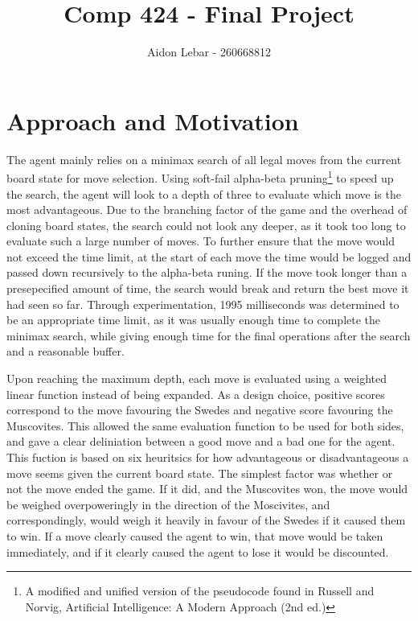 \documentclass[11 pt, letter paper]{article}
\title{Comp 424 - Final Project}
\author{Aidon Lebar - 260668812}
\begin{document}
    \maketitle
    \section{Approach and Motivation}
        The agent mainly relies on a minimax search of all legal moves from the current board state for move selection.
        Using soft-fail alpha-beta pruning\footnote{A modified and unified version of the pseudocode found in Russell and Norvig, Artificial Intelligence: A Modern Approach (2nd ed.)}
        to speed up the search, the agent will look to a depth of three to evaluate which move is the most advantageous.
        Due to the branching factor of the game and the overhead of cloning board states,
        the search could not look any deeper, as it took too long to evaluate such a large number of moves.
        To further ensure that the move would not exceed the time limit, at the start of each move the time would be logged and passed down recursively to the alpha-beta runing.
        If the move took longer than a presepecified amount of time, the search would break and return the best move it had seen so far.
        Through experimentation, 1995 milliseconds was determined to be an appropriate time limit,
        as it was usually enough time to complete the minimax search, while giving enough time for the final operations after the search and a reasonable buffer.

        Upon reaching the maximum depth, each move is evaluated using a weighted linear function instead of being expanded.
        As a design choice, positive scores correspond to the move favouring the Swedes and negative score favouring the Muscovites.
        This allowed the same evaluation function to be used for both sides, and gave a clear deliniation between a good move and a bad one for the agent.
        This fuction is based on six heuritsics for how advantageous or disadvantageous a move seems given the current board state.
        The simplest factor was whether or not the move ended the game. If it did, and the Muscovites won, the move would be weighed overpoweringly
        in the direction of the Moscivites, and correspondingly, would weigh it heavily in favour of the Swedes if it caused them to win.
        If a move clearly caused the agent to win, that move would be taken immediately, and if it clearly caused the agent to lose it would be discounted.
\end{document}

